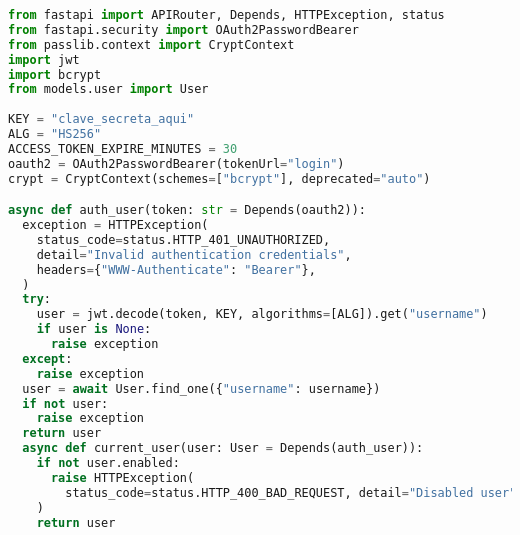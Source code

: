 
\begin{lstlisting}[label=cod:vControl,caption=Pseudocódigo del control de acceso, language=Python]
from fastapi import APIRouter, Depends, HTTPException, status
from fastapi.security import OAuth2PasswordBearer
from passlib.context import CryptContext
import jwt
import bcrypt
from models.user import User
    
KEY = "clave_secreta_aqui"
ALG = "HS256"
ACCESS_TOKEN_EXPIRE_MINUTES = 30
oauth2 = OAuth2PasswordBearer(tokenUrl="login")
crypt = CryptContext(schemes=["bcrypt"], deprecated="auto")

async def auth_user(token: str = Depends(oauth2)):
  exception = HTTPException(
    status_code=status.HTTP_401_UNAUTHORIZED,
    detail="Invalid authentication credentials",
    headers={"WWW-Authenticate": "Bearer"},
  )
  try:
    user = jwt.decode(token, KEY, algorithms=[ALG]).get("username") 
    if user is None:
      raise exception   
  except:
    raise exception
  user = await User.find_one({"username": username})
  if not user:
    raise exception
  return user
  async def current_user(user: User = Depends(auth_user)):
    if not user.enabled:
      raise HTTPException(
        status_code=status.HTTP_400_BAD_REQUEST, detail="Disabled user"
    )
    return user
\end{lstlisting}